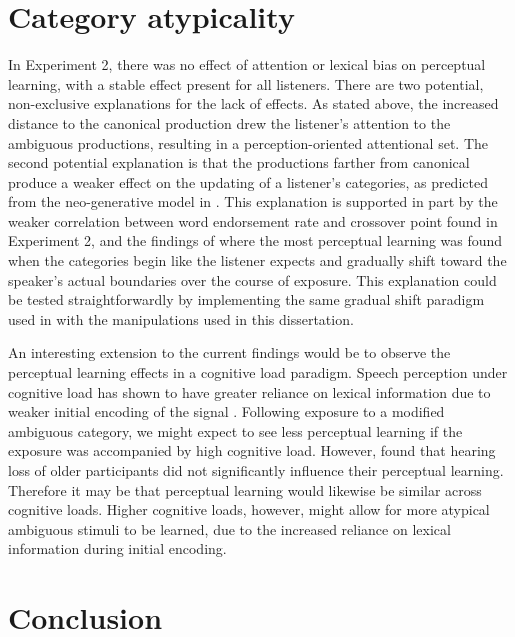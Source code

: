 \section{Category atypicality}

In Experiment 2, there was no effect of attention or lexical bias on perceptual learning, with a stable effect present for all listeners.
There are two potential, non-exclusive explanations for the lack of effects.
As stated above, the increased distance to the canonical production drew the listener's attention to the ambiguous productions, resulting in a perception-oriented attentional set.
The second potential explanation is that the productions farther from canonical produce a weaker effect on the updating of a listener's categories, as predicted from the neo-generative model in \citep{Pierrehumbert2002}.
This explanation is supported in part by the weaker correlation between word endorsement rate and crossover point found in Experiment 2, and the findings of \citet{Sumner2011} where the most perceptual learning was found when the categories begin like the listener expects and gradually shift toward the speaker's actual boundaries over the course of exposure.
This explanation could be tested straightforwardly by implementing the same gradual shift paradigm used in \citet{Sumner2011} with the manipulations used in this dissertation.

An interesting extension to the current findings would be to observe the perceptual learning effects in a cognitive load paradigm.  Speech perception under cognitive load has shown to have greater reliance on lexical information due to weaker initial encoding of the signal \citep{Mattys2011}.  Following exposure to a modified ambiguous category, we might expect to see less perceptual learning if the exposure was accompanied by high cognitive load.  However, \citet{Scharenborg2014} found that hearing loss of older participants did not significantly influence their perceptual learning.  Therefore it may be that perceptual learning would likewise be similar across cognitive loads.
Higher cognitive loads, however, might allow for more atypical ambiguous stimuli to be learned, due to the increased reliance on lexical information during initial encoding.

\section{Conclusion}

